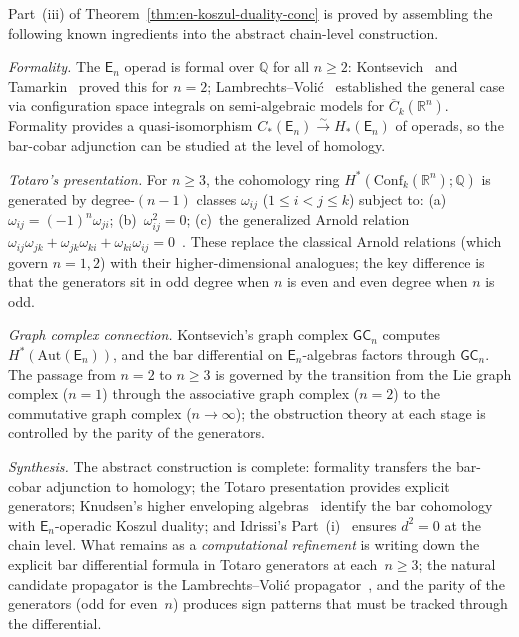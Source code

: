 \begin{remark}\label{rem:en-proof-strategy}
Part~(iii) of Theorem~\ref{thm:en-koszul-duality-conc} is proved by
assembling the following known ingredients into the abstract
chain-level construction.

\emph{Formality.}
The $\mathsf{E}_n$ operad is formal over $\mathbb{Q}$ for all
$n \geq 2$: Kontsevich~\cite{Kon99} and Tamarkin~\cite{Tamarkin00}
proved this for $n = 2$;
Lambrechts--Voli\'c~\cite{LambrechtsVolic14} established the
general case via configuration space integrals on semi-algebraic
models for $\overline{C}_k(\mathbb{R}^n)$. Formality provides a
quasi-isomorphism $C_*(\mathsf{E}_n) \xrightarrow{\sim}
H_*(\mathsf{E}_n)$ of operads, so the bar-cobar adjunction can be
studied at the level of homology.

\emph{Totaro's presentation.}
For $n \geq 3$, the cohomology ring
$H^*(\mathrm{Conf}_k(\mathbb{R}^n); \mathbb{Q})$ is generated by
degree-$(n-1)$ classes $\omega_{ij}$ ($1 \leq i < j \leq k$)
subject to: (a)~$\omega_{ij} = (-1)^n \omega_{ji}$;
(b)~$\omega_{ij}^2 = 0$; (c)~the generalized Arnold relation
$\omega_{ij}\omega_{jk} + \omega_{jk}\omega_{ki} +
\omega_{ki}\omega_{ij} = 0$~\cite{Totaro96,Coh76}. These replace
the classical Arnold relations (which govern $n = 1, 2$) with
their higher-dimensional analogues; the key difference is that the
generators sit in odd degree when $n$ is even and even degree when
$n$ is odd.

\emph{Graph complex connection.}
Kontsevich's graph complex $\mathsf{GC}_n$ computes
$H^*(\mathrm{Aut}(\mathsf{E}_n))$, and the bar differential on
$\mathsf{E}_n$-algebras factors through $\mathsf{GC}_n$.
The passage from $n = 2$ to $n \geq 3$ is governed by the
transition from the Lie graph complex ($n = 1$) through the
associative graph complex ($n = 2$) to the commutative graph complex
($n \to \infty$); the obstruction theory at each stage is controlled
by the parity of the generators.

\emph{Synthesis.}
The abstract construction is complete: formality transfers
the bar-cobar adjunction to homology; the Totaro presentation
provides explicit generators; Knudsen's higher enveloping
algebras~\cite{Knudsen18} identify the bar cohomology with
$\mathsf{E}_n$-operadic Koszul duality; and Idrissi's
Part~(i)~\cite{Idrissi22} ensures $d^2 = 0$ at the chain level.
What remains as a \emph{computational refinement} is writing down
the explicit bar differential formula in Totaro generators at
each~$n \geq 3$; the natural candidate propagator is the
Lambrechts--Voli\'c propagator~\cite{LambrechtsVolic14}, and the
parity of the generators (odd for even~$n$) produces sign patterns
that must be tracked through the differential.
\end{remark}

